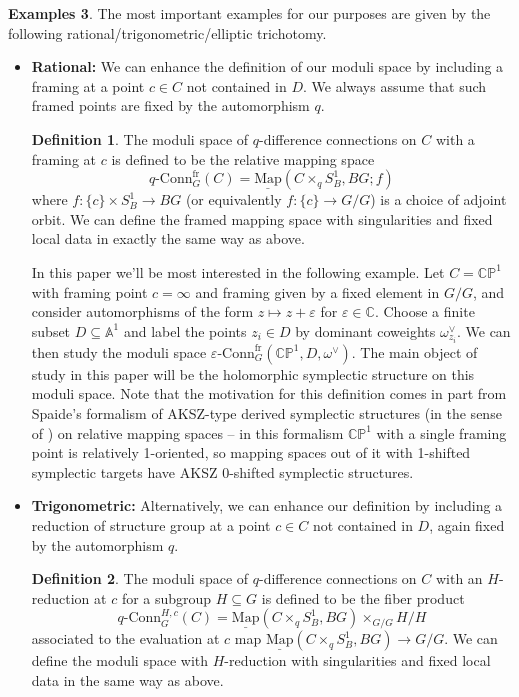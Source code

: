 \documentclass[11pt, oneside, reqno]{amsart}
\theoremstyle{definition} \newtheorem{definition}{Definition}[section]
\theoremstyle{definition} \newtheorem{remark}[definition]{Remark}
\theoremstyle{definition} \newtheorem{remarks}[definition]{Remarks}
\theoremstyle{definition} \newtheorem{question}[definition]{Question}
\theoremstyle{definition} \newtheorem*{note}{Note}
\theoremstyle{definition} \newtheorem{example}[definition]{Example}
\theoremstyle{definition} \newtheorem{examples}[definition]{Examples}
\newcommand{\bb}[1]{\mathbb{#1}}
\newcommand{\mr}[1]{\mathrm{#1}}
\newcommand{\ul}[1]{\underline{#1}}
\newcommand{\CC}{\mathbb{C}}
\newcommand{\eps}{\varepsilon}
\newcommand{\sub}{\subseteq}
\newcommand{\map}{\ul{\mr{Map}}}
\newcommand{\qconn}{q\text{-Conn}}
\newcommand{\epsconn}{\varepsilon\text{-Conn}}
\newcommand{\fr}{\mathrm{fr}}
\begin{document}
\begin{examples}
The most important examples for our purposes are given by the following rational/trigonometric/elliptic trichotomy.
 \begin{itemize}
  \item \textbf{Rational:} We can enhance the definition of our moduli space by including a framing at a point $c \in C$ not contained in $D$.  We always assume that such framed points are fixed by the automorphism $q$.
    \begin{definition}
      \label{def:framing}
    The moduli space of $q$-difference connections on $C$ with a framing at $c$ is defined to be the relative mapping space 
    \[\qconn_G^\fr(C) = \map(C \times_q S^1_B, BG; f)\]
    where $f \colon \{c\} \times S^1_B \to BG$ (or equivalently $f \colon \{c\} \to G/G$) is a choice of adjoint orbit.  We can define the framed mapping space with singularities and fixed local data in exactly the same way as above.  
  \end{definition}
    
  In this paper we'll be most interested in the following example.  Let $C = \bb{CP}^1$ with framing point $c = \infty$ and framing given by a fixed element in $G/G$, and consider automorphisms of the form $z \mapsto z + \eps$ for $\eps \in \CC$.  Choose a finite subset $D \sub \bb A^1$ and label the points $z_i \in D$ by dominant coweights $\omega^\vee_{z_i}$.  We can then study the moduli space $\epsconn^\fr_G(\bb{CP}^1,D, \omega^\vee)$.  The main object of study in this paper will be the holomorphic symplectic structure on this moduli space. Note that the motivation for this definition comes in part from
    Spaide's formalism \cite{Spaide} of AKSZ-type derived symplectic structures (in the sense of \cite{AKSZ,PTVV}) on
    relative mapping spaces -- in this formalism $\bb{CP}^1$ with a single framing point is relatively 1-oriented, so mapping spaces
    out of it with 1-shifted symplectic targets have AKSZ 0-shifted symplectic structures.
  
  \item \textbf{Trigonometric:} Alternatively, we can enhance our definition by including a reduction of structure group at a point $c \in C$ not contained in $D$, again fixed by the automorphism $q$.
  \begin{definition}
   The moduli space of $q$-difference connections on $C$ with an $H$-reduction at $c$ for a subgroup $H \sub G$ is defined to be the fiber product
   \[\qconn_G^{H,c}(C) = \map(C \times_q S^1_B,BG) \times_{G/G} H/H\]
   associated to the evaluation at $c$ map $\map(C \times_q S^1_B,BG) \to G/G$.  We can define the moduli space with $H$-reduction with singularities and fixed local data in the same way as above.
  \end{definition}
  

\end{itemize}
\end{examples}
\end{document}
